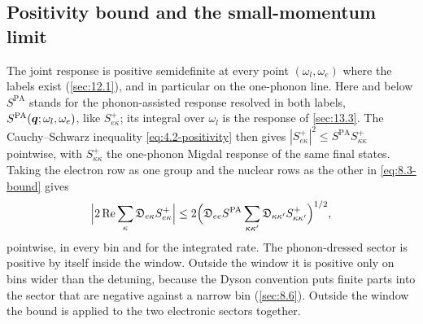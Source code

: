 \subsection{Positivity bound and the small-momentum limit}\label{sec:17.4-bound}

The joint response is positive semidefinite at every point $(\omega_l, \omega_e)$ where the labels exist (\cref{sec:12.1}), and in particular on the one-phonon line. Here and below $S^{\mathrm{PA}}$ stands for the phonon-assisted response resolved in both labels, $S^{\mathrm{PA}}(\bm{q};\omega_l,\omega_e)$, like $S^+_{e\kappa}$; its integral over $\omega_l$ is the response of \cref{sec:13.3}. The Cauchy--Schwarz inequality \cref{eq:4.2-positivity} then gives $|S^+_{e\kappa}|^2 \le S^{\mathrm{PA}}S^+_{\kappa\kappa}$ pointwise, with $S^+_{\kappa\kappa}$ the one-phonon Migdal response of the same final states. Taking the electron row as one group and the nuclear rows as the other in \cref{eq:8.3-bound} gives
\begin{equation}
  \Bigl|2\operatorname{Re}\sum_\kappa\mathfrak{D}_{e\kappa}S^+_{e\kappa}\Bigr| \le 2\Bigl(\mathfrak{D}_{ee}S^{\mathrm{PA}}\sum_{\kappa\kappa'}\mathfrak{D}_{\kappa\kappa'}S^+_{\kappa\kappa'}\Bigr)^{1/2} ,
  \label{eq:17.4-bound}
\end{equation}
pointwise, in every bin and for the integrated rate. The phonon-dressed sector is positive by itself inside the window. Outside the window it is positive only on bins wider than the detuning, because the Dyson convention puts finite parts into the sector that are negative against a narrow bin (\cref{sec:8.6}). Outside the window the bound is applied to the two electronic sectors together.

